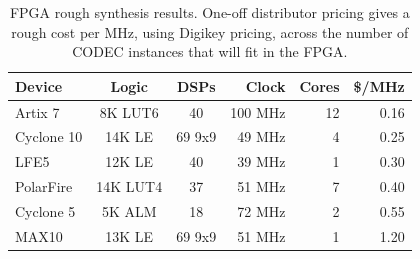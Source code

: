 \begin{table}[t]\centering
	\label{tab:FPGAfit}
	\caption{FPGA rough synthesis results. One-off distributor pricing gives a
	rough cost per MHz, using Digikey pricing, across the number of CODEC
	instances that will fit in the FPGA.}
	\centering
	\begin{tabular}{lccrrr}
		\hline\hline
		Device & Logic & DSPs & Clock & Cores & \$/MHz\\ [0.5ex]
		\hline
        Artix 7   & 8K LUT6 & 40   & 100 MHz & 12 & 0.16\\
		Cyclone 10& 14K LE & 69 9x9 & 49 MHz &  4 & 0.25\\
		LFE5      & 12K LE & 40     & 39 MHz &  1 & 0.30\\
        PolarFire & 14K LUT4 & 37   & 51 MHz &  7 & 0.40\\
		Cyclone 5 & 5K ALM & 18     & 72 MHz &  2 & 0.55\\
		MAX10     & 13K LE & 69 9x9 & 51 MHz &  1 & 1.20\\
		\hline
	\end{tabular}
\end{table}

